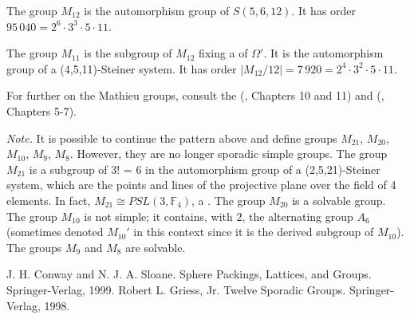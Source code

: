 \documentclass[12pt]{article}
\begin{document}
The group $M_{12}$ is the automorphism group of $S(5,6,12)$.  It has order $95\,040 = 2^6 \cdot 3^3 \cdot 5 \cdot 11$.

The group $M_{11}$ is the subgroup of $M_{12}$ fixing a  of $\Omega'$.  It is the automorphism group of a (4,5,11)-Steiner system.  It has order $|M_{12}/12| = 7\,920 = 2^4 \cdot 3^2 \cdot 5 \cdot 11$.

For further  on the Mathieu groups, consult the  (\cite{splag}, Chapters 10 and 11) and (\cite{sporadic}, Chapters 5-7).

\emph{Note.}  It is possible to continue the pattern above and define groups $M_{21}$, $M_{20}$, $M_{10}$, $M_9$, $M_8$.  However, they are no longer sporadic simple groups.  The group $M_{21}$ is a subgroup of  3! = 6 in the automorphism group of a (2,5,21)-Steiner system, which are the points and lines of the projective plane over the field of 4 elements.  In fact, $M_{21} \cong PSL(3,\mathbb{F}_4)$, a .  The group $M_{20}$ is a solvable group.  The group $M_{10}$ is not simple; it contains, with  2, the alternating group $A_6$ (sometimes denoted $M_{10}'$ in this context since it is the derived subgroup of $M_{10}$).  The groups $M_9$ and $M_8$ are solvable.

\begin{thebibliography}{9}
 J. H. Conway and N. J. A. Sloane. Sphere Packings, Lattices, and Groups. Springer-Verlag, 1999.
 Robert L. Griess, Jr. Twelve Sporadic Groups. Springer-Verlag, 1998.
\end{thebibliography}
\end{document}
